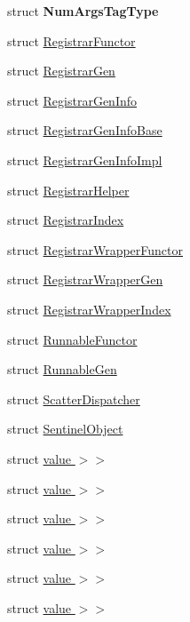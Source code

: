 \begin{DoxyCompactItemize}
\item 
struct {\bfseries Num\+Args\+Tag\+Type}
\item 
struct \hyperlink{structvt_1_1auto__registry_1_1_registrar_functor}{Registrar\+Functor}
\item 
struct \hyperlink{structvt_1_1auto__registry_1_1_registrar_gen}{Registrar\+Gen}
\item 
struct \hyperlink{structvt_1_1auto__registry_1_1_registrar_gen_info}{Registrar\+Gen\+Info}
\item 
struct \hyperlink{structvt_1_1auto__registry_1_1_registrar_gen_info_base}{Registrar\+Gen\+Info\+Base}
\item 
struct \hyperlink{structvt_1_1auto__registry_1_1_registrar_gen_info_impl}{Registrar\+Gen\+Info\+Impl}
\item 
struct \hyperlink{structvt_1_1auto__registry_1_1_registrar_helper}{Registrar\+Helper}
\item 
struct \hyperlink{structvt_1_1auto__registry_1_1_registrar_index}{Registrar\+Index}
\item 
struct \hyperlink{structvt_1_1auto__registry_1_1_registrar_wrapper_functor}{Registrar\+Wrapper\+Functor}
\item 
struct \hyperlink{structvt_1_1auto__registry_1_1_registrar_wrapper_gen}{Registrar\+Wrapper\+Gen}
\item 
struct \hyperlink{structvt_1_1auto__registry_1_1_registrar_wrapper_index}{Registrar\+Wrapper\+Index}
\item 
struct \hyperlink{structvt_1_1auto__registry_1_1_runnable_functor}{Runnable\+Functor}
\item 
struct \hyperlink{structvt_1_1auto__registry_1_1_runnable_gen}{Runnable\+Gen}
\item 
struct \hyperlink{structvt_1_1auto__registry_1_1_scatter_dispatcher}{Scatter\+Dispatcher}
\item 
struct \hyperlink{structvt_1_1auto__registry_1_1_sentinel_object}{Sentinel\+Object}
\item 
struct \hyperlink{structvt_1_1auto__registry_1_1_registrar_functor_3_01_runnable_t_00_01_reg_t_00_01_info_t_00_01_ec57e5bbdf77219785996b8aa3819a29}{value $>$$>$}
\item 
struct \hyperlink{structvt_1_1auto__registry_1_1_registrar_helper_3_01_runnable_t_00_01_reg_t_00_01_info_t_00_01_f99b40767eb3aff35ccfdc592721ff945}{value $>$$>$}
\item 
struct \hyperlink{structvt_1_1auto__registry_1_1_registrar_functor_3_01_runnable_t_00_01_reg_t_00_01_info_t_00_01_4e1b66c1fb5f9a7f528e44d26c164c07}{value $>$$>$}
\item 
struct \hyperlink{structvt_1_1auto__registry_1_1_registrar_helper_3_01_runnable_t_00_01_reg_t_00_01_info_t_00_01_f088bfe4085ec4873f9421256b755c7cc}{value $>$$>$}
\item 
struct \hyperlink{structvt_1_1auto__registry_1_1_registrar_helper_3_01_runnable_t_00_01_reg_t_00_01_info_t_00_01_f217d2e10f45b17517a6a17cd37637802}{value $>$$>$}
\item 
struct \hyperlink{structvt_1_1auto__registry_1_1_registrar_helper_3_01_runnable_t_00_01_reg_t_00_01_info_t_00_01_f89013229108d15297d7bd1027e58f098}{value $>$$>$}
\end{DoxyCompactItemize}
